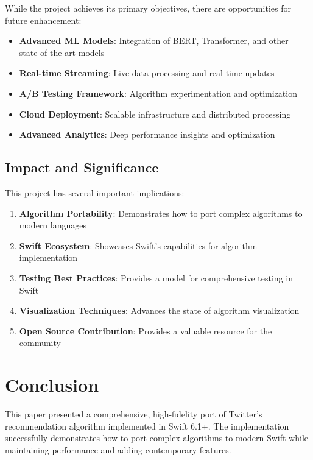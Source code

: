 \documentclass[11pt,a4paper]{article}
\begin{document}
While the project achieves its primary objectives, there are opportunities for future enhancement:

\begin{itemize}
    \item \textbf{Advanced ML Models}: Integration of BERT, Transformer, and other state-of-the-art models
    \item \textbf{Real-time Streaming}: Live data processing and real-time updates
    \item \textbf{A/B Testing Framework}: Algorithm experimentation and optimization
    \item \textbf{Cloud Deployment}: Scalable infrastructure and distributed processing
    \item \textbf{Advanced Analytics}: Deep performance insights and optimization
\end{itemize}

\subsection{Impact and Significance}

This project has several important implications:

\begin{enumerate}
    \item \textbf{Algorithm Portability}: Demonstrates how to port complex algorithms to modern languages
    \item \textbf{Swift Ecosystem}: Showcases Swift's capabilities for algorithm implementation
    \item \textbf{Testing Best Practices}: Provides a model for comprehensive testing in Swift
    \item \textbf{Visualization Techniques}: Advances the state of algorithm visualization
    \item \textbf{Open Source Contribution}: Provides a valuable resource for the community
\end{enumerate}

\section{Conclusion}

This paper presented a comprehensive, high-fidelity port of Twitter's recommendation algorithm implemented in Swift 6.1+. The implementation successfully demonstrates how to port complex algorithms to modern Swift while maintaining performance and adding contemporary features.
\end{document}
